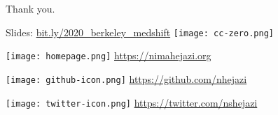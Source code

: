 \documentclass{beamer}
\begin{document}
\begin{frame}[c]{Thank you.}

\large
Slides: \href{http://bit.ly/2020\_berkeley\_medshift}{bit.ly/2020\_berkeley\_medshift}
  \quad \texttt{[image: cc-zero.png]}

\vspace{2mm}
\texttt{[image: homepage.png]} \url{https://nimahejazi.org}

\vspace{2mm}
\texttt{[image: github-icon.png]}
  \url{https://github.com/nhejazi}

\vspace{2mm}
\texttt{[image: twitter-icon.png]}
  \url{https://twitter.com/nshejazi}

\end{frame}








\end{document}

